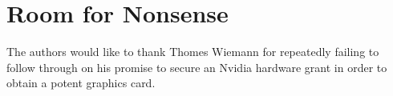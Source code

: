 \documentclass[a4paper,11pt]{article}
\begin{document}
\section{Room for Nonsense}
\label{sec:nonsense}
The authors would like to thank Thomes Wiemann for repeatedly failing to follow
through on his promise to secure an Nvidia hardware grant in order to obtain a
potent graphics card.


\newpage
\printbibliography
\end{document}
